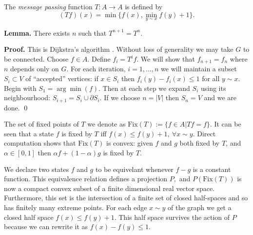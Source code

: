 \documentclass[11pt]{article}
\begin{document}
The \emph{message passing} function
$T:A\to A$ is defined by
$$(Tf)(x) = \min\{f(x), \min_{y\sim x} f(y)+1\}.$$

{\bf Lemma.} There exists $n$ such that $T^{n+1} = T^n.$

{\bf Proof.}
This is Dijkstra's algorithm \cite{Dijkstra1959}.
Without loss of generality we may take
$G$ to be connected.
Choose $f\in A.$
Define $f_i = T^i f.$
We will show that $f_{n+1} = f_n$
where $n$ depends only on $G.$
For each iteration, $i=1,...,n$
we will maintain a subset $S_i\subset V$
of ``accepted'' vertices:
if $x\in S_i$ then $f_i(y)-f_i(x)\le 1$ for all $y\sim x.$
Begin with $S_1=\arg\min(f).$
Then at each step we expand $S_i$ using its
neighbourhood: $S_{i+1}=S_i\cup \partial S_i.$
If we choose $n=|V|$ then $S_n=V$ and we are done.
\qed


\def\Fix{\mathrm{Fix}}

The set of fixed points of $T$ we denote as
$\Fix(T):=\{f\in A|Tf=f\}.$
It can be seen that
a state $f$ is fixed by $T$ iff
$f(x)\le f(y)+1,\ \forall x\sim y.$
Direct computation shows that
$\Fix(T)$ is convex:
given $f$ and $g$ both fixed by $T$,
and $\alpha\in[0, 1]$ then $\alpha f + (1-\alpha) g$
is fixed by $T$.

We declare two states $f$ and $g$
to be equivelant whenever $f-g$ is a constant function.
This equivalence relation defines a projection $P,$
and $P(\Fix(T))$ is now a compact convex subset of
a finite dimensional real vector space.
Furthermore, this set is the intersection
of a finite set of closed half-spaces and
so has finitely many extreme points.
For each edge $x\sim y$ of the graph
we get a closed half space
$f(x)\le f(y)+1.$
This half space survives the action of $P$
because we can rewrite it as $f(x)-f(y)\le 1.$
\end{document}
